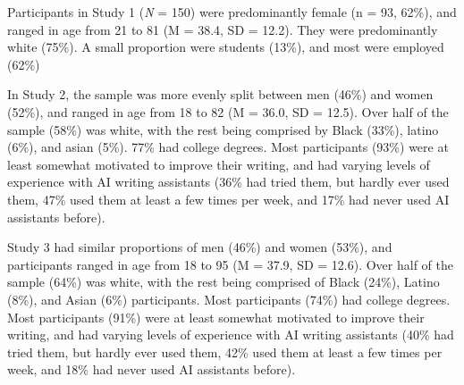 \documentclass[11pt]{report}
\begin{document}
\begin{mainf}
Participants in Study 1 (\textit{N} = 150) were predominantly female (n = 93, 62\%), and ranged in age from 21 to 81 (M = 38.4, SD = 12.2). They were predominantly white (75\%). A small proportion were students (13\%), and most were employed (62\%)

In Study 2, the sample was more evenly split between men (46\%) and women (52\%), and ranged in age from 18 to 82 (M = 36.0, SD = 12.5). Over half of the sample (58\%) was white, with the rest being comprised by Black (33\%), latino (6\%), and asian (5\%). 77\% had college degrees. Most participants (93\%) were at least somewhat motivated to improve their writing, and had varying levels of experience with AI writing assistants (36\% had tried them, but hardly ever used them, 47\% used them at least a few times per week, and 17\% had never used AI assistants before).

Study 3 had similar proportions of men (46\%) and women (53\%), and participants ranged in age from 18 to 95 (M = 37.9, SD = 12.6). Over half of the sample (64\%) was white, with the rest being comprised of Black (24\%), Latino (8\%), and Asian (6\%) participants. Most participants (74\%) had college degrees. Most participants (91\%) were at least somewhat motivated to improve their writing, and had varying levels of experience with AI writing assistants (40\% had tried them, but hardly ever used them, 42\% used them at least a few times per week, and 18\% had never used AI assistants before).


\end{mainf}
\end{document}
